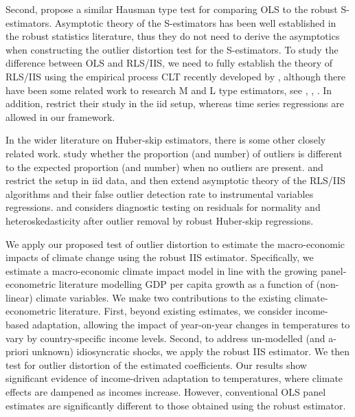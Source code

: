 \documentclass[11pt, letterpaper]{article}
\numberwithin{algorithm}{section}
\numberwithin{assumption}{section}
\numberwithin{lemma}{section}
\numberwithin{theorem}{section}
\numberwithin{corollary}{section}
\numberwithin{remark}{section}
\numberwithin{equation}{section}
\numberwithin{figure}{section}
\numberwithin{table}{section}
\begin{document}
Second, \cite{dehon2012extending} propose a similar Hausman type test for comparing OLS to the robust S-estimators. Asymptotic theory of the S-estimators has been well established in the robust statistics literature, thus they do not need to derive the asymptotics when constructing the outlier distortion test for the S-estimators. To study the difference between OLS and RLS/IIS, we need to fully establish the theory of RLS/IIS using the empirical process CLT recently developed by \cite{berenguer2019analysis}, although there have been some related work to research M and L type estimators, see \cite{hendry2008automatic}, \cite{johansen2009analysis, johansen2013outlier, johansen2016analysis, johansen2016asymptotic, johansen2019boundedness}, \cite{jiao2015asymptotic}. In addition, \cite{dehon2012extending} restrict their study in the iid setup, whereas time series regressions are allowed in our framework.

In the wider literature on Huber-skip estimators, there is some other closely related work. \cite{jiao2020testingoutlier} study whether the proportion (and number) of outliers is different to the expected proportion (and number) when no outliers are present. \cite{jiao2019robustIV} and \cite{jiao2021asymptoitcFODR2SLS} restrict the setup in iid data, and then extend asymptotic theory of the RLS/IIS algorithms and their false outlier detection rate to instrumental variables regressions. \cite{berenguer2018marked} and \cite{berenguer2021heteroscedasticity} considers diagnostic testing on residuals for normality and heteroskedasticity after outlier removal by robust Huber-skip regressions.

We apply our proposed test of outlier distortion to estimate the macro-economic impacts of climate change using the robust IIS estimator. Specifically, we estimate a macro-economic climate impact model in line with the growing panel-econometric literature modelling GDP per capita growth as a function of (non-linear) climate variables. We make two contributions to the existing climate-econometric literature. First, beyond existing estimates, we consider income-based adaptation, allowing the impact of year-on-year changes in temperatures to vary by country-specific income levels. Second, to address un-modelled (and a-priori unknown) idiosyncratic shocks, we apply the robust IIS estimator. We then test for outlier distortion of the estimated coefficients. Our results show significant evidence of income-driven adaptation to temperatures, where climate effects are dampened as incomes increase. However, conventional OLS panel estimates are significantly different to those obtained using the robust estimator.
\end{document}
